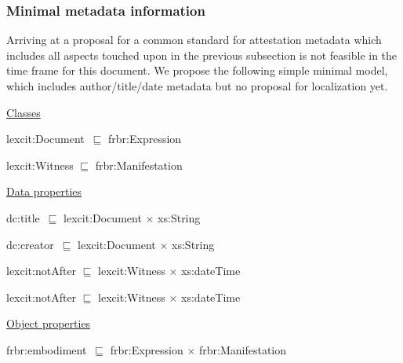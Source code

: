 \documentclass[10pt]{article}
\begin{document}
\subsubsection*{Minimal metadata information}


Arriving at a proposal for a common standard for attestation metadata which includes all aspects touched upon in the previous subsection is not feasible in the time frame for this document. We propose the following simple minimal model, which includes author/title/date metadata but no proposal for localization yet.


\bigskip


{\fontsize{9pt}{10.8pt}\selectfont 
\uline{Classes}

lexcit:Document\  $\sqsubseteq$  frbr:Expression

lexcit:Witness $\sqsubseteq$  frbr:Manifestation




 \uline{Data properties}

dc:title\  $\sqsubseteq$  lexcit:Document $ \times $  xs:String

dc:creator\  $\sqsubseteq$  lexcit:Document $ \times $  xs:String

lexcit:notAfter $\sqsubseteq$  lexcit:Witness $ \times $  xs:dateTime

lexcit:notAfter $\sqsubseteq$  lexcit:Witness $ \times $  xs:dateTime





\uline{Object properties}

frbr:embodiment\   $\sqsubseteq$  frbr:Expression $ \times $  frbr:Manifestation
}


\par









\end{document}
